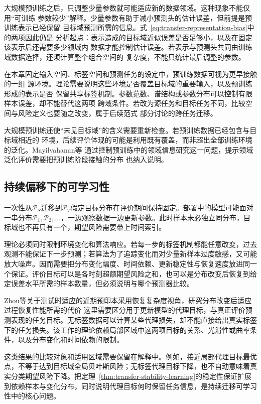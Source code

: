 大规模预训练之后，只调整少量参数就可能适应新的数据领域。这种现象不能仅用“可训练
参数较少”解释。少量参数有助于减小预测头的估计误差，但前提是预训练表示已经保留
目标域预测所需的信息。式~\eqref{eq:transfer-representation-bias}中的两项因此仍是
分析起点：表示造成的目标域近似误差是否足够小，以及在固定该表示后还需要多少领域内
数据才能控制估计误差。若表示与预测头共同由训练域数据选择，还须计算整个组合空间的
复杂度，不能只统计最后调整的参数。

在本章固定输入空间、标签空间和预测任务的设定中，预训练数据可视为更早接触的一组
源环境。理论需要说明这些环境是否覆盖目标域的重要输入，以及预训练形成的表示是否
保留共享标签机制。参数范数、谱结构或参数分布可以控制有限样本误差，却不能替代这两项
跨域条件。若改为源任务和目标任务不同，比较空间与风险定义也要随之改变，属于后续范式
部分讨论的跨任务迁移。

大规模预训练还使“未见目标域”的含义需要重新检查。若预训练数据已经包含与目标域相近的
环境，后续评价体现的可能是利用既有覆盖，而非超出全部训练环境的泛化。Mayilvahanan等
通过控制预训练中的领域信息研究这一问题，提示领域泛化评价需要把预训练阶段接触的分布
也纳入说明。

\subsection{持续偏移下的可学习性}
\label{sec:transfer-frontier-online}

一次性从$\mathcal P_S$迁移到$\mathcal P_T$假定目标分布在评价期间保持固定。部署中的模型可能面对一串分布$\mathcal P_1,\mathcal P_2,\ldots$，一边观察数据一边更新参数。此时样本未必独立同分布，目标域也不再只有一个，期望风险需要带上时间索引。

理论必须同时限制环境变化和算法响应。若每一步的标签机制都能任意改变，过去观测不能保证下一步预测；若算法为了追踪变化而对少量新样本过度敏感，又可能放大噪声。因而需要把分布变化幅度、时间依赖、更新稳定性与恢复速度放进同一个保证。评价目标可以是各时刻超额期望风险之和，也可以是分布改变后恢复到给定误差水平所需的样本数量，但必须说明与哪个预测器比较。

Zhou等关于测试时适应的近期预印本采用恢复复杂度视角，研究分布改变后适应过程恢复性能所需的代价 这里需要区分用于更新模型的代理目标，与真正评价预测表现的任务目标。无标签数据可以计算某些代理损失，却不能直接给出真实标签下的任务损失。该工作的理论依赖局部区域中这两项目标的关系、光滑性或曲率条件，以及分布变化和时间依赖的限制。

这类结果的比较对象和适用区域需要保留在解释中。例如，接近局部代理目标最优点，不等于达到目标域全局贝叶斯风险；无标签代理目标下降，也不自动意味着真实分类期望风险下降。把定理~\ref{thm:transfer-stability-learning}的稳定性保证扩展到依赖样本与变化分布，同时说明代理目标何时保留任务信息，是持续迁移可学习性中的核心问题。

